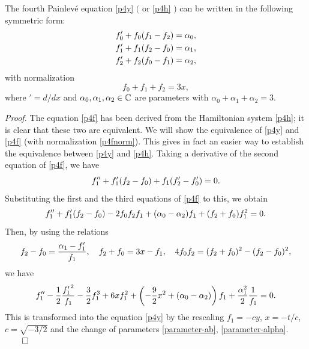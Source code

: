 \begin{thm}\label{symmform}
The fourth Painlev\'e equation \eqref{p4y} $($ or \eqref{p4h} $)$  
can be written in the following symmetric form: 
\begin{equation}
\begin{align}
\label{p4f}
&f'_0+f_0(f_1-f_2)=\alpha_0, \notag\\
&f'_1+f_1(f_2-f_0)=\alpha_1,  \\
&f'_2+f_2(f_0-f_1)=\alpha_2, \notag
\end{align}
\end{equation}
with normalization
\begin{equation}\label{p4fnorm}
f_0+f_1+f_2=3x, 
\end{equation}
where $'=d/dx$ and $\alpha_0, \alpha_1, \alpha_2\in{\Bbb C}$ are parameters
with $\alpha_0+\alpha_1+\alpha_2=3$. 
\end{thm}
\medskip\noindent
{\em Proof.}\quad
The equation \eqref{p4f} has been derived from the Hamiltonian 
system \eqref{p4h}; it is clear that these two are equivalent.
We will show the equivalence of \eqref{p4y}
and \eqref{p4f} (with normalization \eqref{p4fnorm}).
This gives in fact an easier way to establish the equivalence
between \eqref{p4y} and \eqref{p4h}.
Taking a derivative of the second equation of \eqref{p4f}, we have
\begin{equation}
f_1''+f_1'(f_2-f_0)+f_1(f_2'-f_0')=0.
\notag
\end{equation}
Substituting the first and the third equations of \eqref{p4f} to this, 
we obtain
\begin{equation}
f_1''+f_1'(f_2-f_0)-2f_0f_2f_1+(\alpha_0-\alpha_2)f_1+(f_2+f_0)f_1^2=0.
\notag
\end{equation}
Then, by using the relations
\begin{equation}
f_2-f_0={\alpha_1-f_1' \over f_1}, \quad
f_2+f_0=3x-f_1,
\quad
4f_0f_2=(f_2+f_0)^2-(f_2-f_0)^2,
\notag
\end{equation}
we have
\begin{equation}
f_1''-{1 \over 2} {{f_1'}^2 \over f_1}-{3 \over 2} f_1^3+6x f_1^2+
\left( -{9 \over 2}x^2+(\alpha_0-\alpha_2) \right) f_1+{\alpha_1^2 \over 2}
{1 \over f_1}=0.
\notag
\end{equation}
This is transformed into the equation \eqref{p4y} by the rescaling
$f_1=-cy$, $x=-t/c$, $c=\sqrt{-3/2}$ and the change of parameters 
\eqref{parameter-ab}, \eqref{parameter-alpha}.
$\qed$

